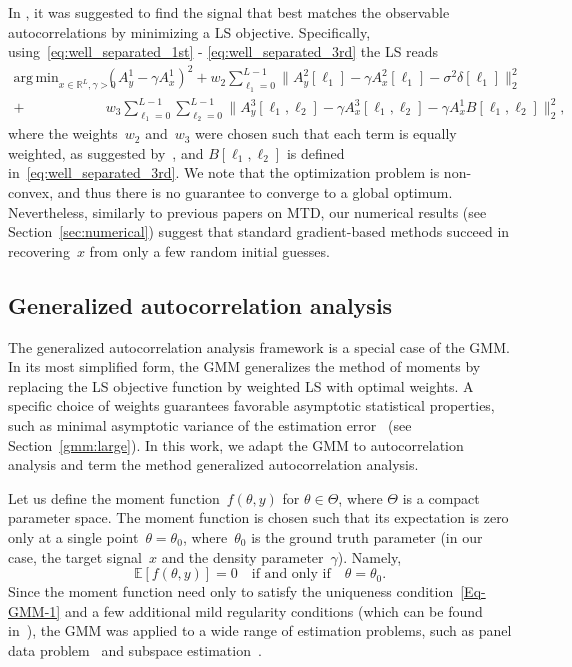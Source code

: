 \documentclass{article}
\DeclareMathOperator*{\argmin}{arg\,min}
\newcommand{\E}[0]{\mathbb{E}}
\begin{document}
In \cite{bendory2019multi,lan2020multi,marshall2020image,bendory2021multi,kreymer2021two}, it was suggested to find the signal that best matches the observable autocorrelations by minimizing a LS objective. Specifically, using~\eqref{eq:well_separated_1st} - \eqref{eq:well_separated_3rd} the LS reads
\begin{align}
\label{eq:optimization}
\argmin_{x\in\mathbb{R}^L, \gamma > 0} & (A_y^1 - \gamma A_x^1)^2  + w_2 \sum_{\ell_1 = 0}^{L - 1} \|A_y^2[\ell_1] - \gamma A_x^2[\ell_1] - \sigma^2 \delta[\ell_1]\|_2^2\nonumber\\ +& w_3 \sum_{\ell_1 = 0}^{L - 1} \sum_{\ell_2 = 0}^{L - 1} \|A_y^3[\ell_1, \ell_2] - \gamma A_x^3[\ell_1, \ell_2] - \gamma A_{x}^1 B[\ell_1, \ell_2]\|_2^2,
\end{align}
where the weights~$w_2$ and~$w_3$ were chosen such that each term is equally weighted, as suggested by~\cite{bendory2019multi}, and $B[\ell_1, \ell_2]$ is defined in~\eqref{eq:well_separated_3rd}. We note that the optimization problem is non-convex, and thus there is no guarantee to converge to a global optimum. Nevertheless, similarly to previous papers on MTD, our numerical results (see Section~\ref{sec:numerical}) suggest that standard gradient-based methods succeed in recovering~$x$ from only a few random initial guesses.

\subsection{Generalized autocorrelation analysis}
\label{subsec:generalized_ac}
The generalized autocorrelation analysis framework is a special case of the GMM.  In its most simplified form, the GMM generalizes the method of moments by replacing the LS objective function by  weighted LS with  optimal weights. A specific  choice of weights guarantees favorable asymptotic statistical properties, such as  minimal asymptotic variance of the estimation error~\cite{Hansen1982} {(see Section~\ref{gmm:large})}. In this work, we adapt the GMM to autocorrelation analysis and term the method generalized autocorrelation analysis.

Let us define the moment function~$f(\theta, y)$  for $\theta\in\Theta$, where $\Theta$ is a compact parameter space.
 The moment function is chosen such that its expectation is zero only at a single point~$\theta=\theta_0$, where~$\theta_0$ is the ground truth parameter (in our case, the target signal~$x$ and the density parameter~$\gamma$). Namely,
\begin{equation}\label{Eq-GMM-1}
	\E\left[f(\theta,y)\right] = 0 \quad \text{if and only if} \quad \theta = \theta_0.
\end{equation}
Since the moment function need only to satisfy the uniqueness condition~\eqref{Eq-GMM-1} and a few additional mild regularity conditions (which can be found in~\cite{Hansen1982,abas2021generalized,Hall2005}), the GMM was applied to a wide range of estimation problems,  such as panel data problem~\cite{blundell2000gmm} and subspace estimation~\cite{fan2018optimal}.
\end{document}
